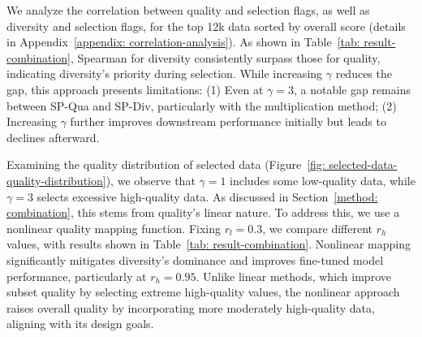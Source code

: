 We analyze the correlation between quality and selection flags, as well as diversity and selection flags, for the top 12k data sorted by overall score (details in Appendix~\ref{appendix: correlation-analysis}). As shown in Table~\ref{tab: result-combination}, Spearman for diversity consistently surpass those for quality, indicating diversity's priority during selection. While increasing \(\gamma\) reduces the gap, this approach presents limitations: (1) Even at \(\gamma=3\), a notable gap remains between SP-Qua and SP-Div, particularly with the multiplication method; (2) Increasing \(\gamma\) further improves downstream performance initially but leads to declines afterward. 

Examining the quality distribution of selected data (Figure~\ref{fig: selected-data-quality-distribution}), we observe that \(\gamma=1\) includes some low-quality data, while \(\gamma=3\) selects excessive high-quality data. As discussed in Section~\ref{method: combination}, this stems from quality's linear nature. To address this, we use a nonlinear quality mapping function. Fixing \(r_l=0.3\), we compare different \(r_h\) values, with results shown in Table~\ref{tab: result-combination}. Nonlinear mapping significantly mitigates diversity's dominance and improves fine-tuned model performance, particularly at \(r_h=0.95\). Unlike linear methods, which improve subset quality by selecting extreme high-quality values, the nonlinear approach raises overall quality by incorporating more moderately high-quality data, aligning with its design goals.
